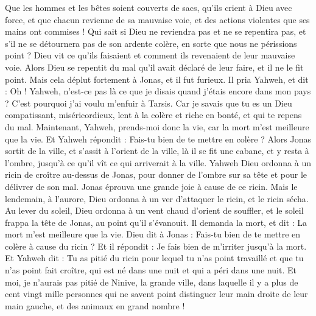 \begin{multicols}{2}
Que les hommes et les bêtes soient couverts de sacs, qu'ils crient à Dieu avec force, et que chacun revienne de sa mauvaise voie, et des actions violentes que ses mains ont commises !
Qui sait si Dieu ne reviendra pas et ne se repentira pas, et s'il ne se détournera pas de son ardente colère, en sorte que nous ne périssions point ?
Dieu vit ce qu’ils faisaient et comment ils revenaient de leur mauvaise voie. Alors Dieu se repentit du mal qu'il avait déclaré de leur faire, et il ne le fit point.
\VerseOne{}Mais cela déplut fortement à Jonas, et il fut furieux.
Il pria Yahweh, et dit : Oh ! Yahweh, n'est-ce pas là ce que je disais quand j'étais encore dans mon pays ? C'est pourquoi j'ai voulu m'enfuir à Tarsis. Car je savais que tu es un Dieu compatissant, miséricordieux, lent à la colère et riche en bonté, et qui te repens du mal.
Maintenant, Yahweh, prends-moi donc la vie, car la mort m'est meilleure que la vie.
Et Yahweh répondit : Fais-tu bien de te mettre en colère ?
Alors Jonas sortit de la ville, et s'assit à l'orient de la ville, là il se fit une cabane, et y resta à l'ombre, jusqu'à ce qu'il vît ce qui arriverait à la ville.
Yahweh Dieu ordonna à un ricin de croître au-dessus de Jonas, pour donner de l’ombre sur sa tête et pour le délivrer de son mal. Jonas éprouva une grande joie à cause de ce ricin.
Mais le lendemain, à l’aurore, Dieu ordonna à un ver d’attaquer le ricin, et le ricin sécha.
Au lever du soleil, Dieu ordonna à un vent chaud d’orient de souffler, et le soleil frappa la tête de Jonas, au point qu’il s’évanouit. Il demanda la mort, et dit : La mort m'est meilleure que la vie.
Dieu dit à Jonas : Fais-tu bien de te mettre en colère à cause du ricin ? Et il répondit : Je fais bien de m’irriter jusqu’à la mort.
Et Yahweh dit : Tu as pitié du ricin pour lequel tu n'as point travaillé et que tu n'as point fait croître, qui est né dans une nuit et qui a péri dans une nuit.
Et moi, je n’aurais pas pitié de Ninive, la grande ville, dans laquelle il y a plus de cent vingt mille personnes qui ne savent point distinguer leur main droite de leur main gauche, et des animaux en grand nombre !
\PPE{}
\end{multicols}
